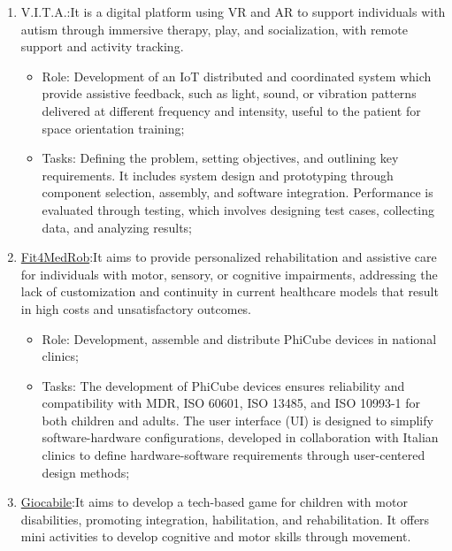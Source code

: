 {
\newline{}
\begin{enumerate}
\item V.I.T.A.:It is a digital platform using VR and AR to support individuals with autism through immersive therapy, play, and socialization, with remote support and activity tracking.
                \begin{itemize}
                \item Role: Development of an IoT distributed and coordinated system which provide assistive feedback, such as light, sound, or vibration patterns delivered at different frequency and intensity, useful to the patient for space orientation training;
                \item Tasks: Defining the problem, setting objectives, and outlining key requirements. It includes system design and prototyping through component selection, assembly, and software integration. Performance is evaluated through testing, which involves designing test cases, collecting data, and analyzing results;
                \end{itemize}    
\item\href{https://www.fit4medrob.it/}{\color{blue}Fit4MedRob}:It aims to provide personalized rehabilitation and assistive care for individuals with motor, sensory, or cognitive impairments, addressing the lack of customization and continuity in current healthcare models that result in high costs and unsatisfactory outcomes.
\begin{itemize}
                \item Role: Development, assemble and distribute PhiCube devices in 
                national clinics;
                \item Tasks: The development of PhiCube devices ensures reliability and compatibility with MDR, ISO 60601, ISO 13485, and ISO 10993-1 for both children and adults. The user interface (UI) is designed to simplify software-hardware configurations, developed in collaboration with Italian clinics to define hardware-software requirements through user-centered design methods;
                \end{itemize}
\item\href{https://www.fondazionecariplo.it/it/progetti/ricerca/progetto-crew.html}{\color{blue}Giocabile}:It aims to develop a tech-based game for children with motor disabilities, promoting integration, habilitation, and rehabilitation. It offers mini activities to develop cognitive and motor skills through movement.

\end{enumerate}}
